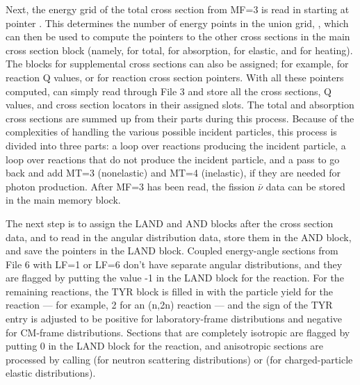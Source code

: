 Next, the energy grid of the total cross section from MF=3 is read
in starting at pointer .  This determines the number of
energy points in the union grid, , which can then be
used to compute the pointers to the other cross sections in the
main cross section block (namely,  for total, 
for absorption,  for elastic, and  for heating).
The blocks for supplemental cross sections can also be assigned;
for example,  for reaction Q values, or 
for reaction cross section pointers.  With all these pointers
computed,  can simply read through File 3 and store
all the cross sections, Q values, and cross section locators in
their assigned slots.  The total and absorption cross sections are
summed up from their parts during this process.  Because of the
complexities of handling the various possible incident particles,
this process is divided into three parts: a loop over reactions
producing the incident particle, a loop over reactions that do not
produce the incident particle, and a pass to go back and add
MT=3 (nonelastic) and MT=4 (inelastic), if they are needed for
photon production.  After MF=3 has been read, the fission $\bar{\nu}$
data can be stored in the main memory block.

The next step is to assign the LAND and AND blocks after the
cross section data, and to read in the angular distribution data,
store them in the AND block, and save the pointers in the LAND block.
Coupled energy-angle sections from File 6 with LF=1 or LF=6 don't
have separate angular distributions, and they are flagged by
putting the value -1 in the LAND block for the reaction.  For
the remaining reactions, the TYR block is filled in with the
particle yield for the reaction --- for example, 2 for an (n,2n)
reaction --- and the sign of the TYR entry is adjusted to be
positive for laboratory-frame distributions and negative for
CM-frame distributions.  Sections that are completely isotropic
are flagged by putting 0 in the LAND block for the reaction,
and anisotropic sections are processed by calling
 (for neutron
scattering distributions) or
 (for
charged-particle elastic distributions).

